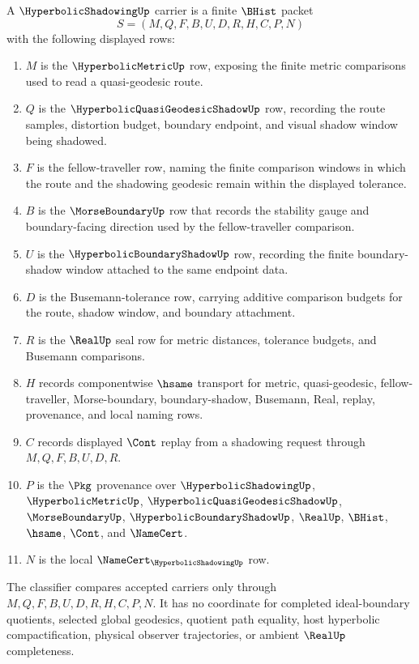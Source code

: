 \begin{definition}
\label{def:hyperbolic-shadowing-carrier}
A $\HyperbolicShadowingUp$ carrier is a finite $\BHist$ packet
$$
S=(M,Q,F,B,U,D,R,H,C,P,N)
$$
with the following displayed rows:
\begin{enumerate}
\item $M$ is the $\HyperbolicMetricUp$ row, exposing the finite metric comparisons used to read a quasi-geodesic route.
\item $Q$ is the $\HyperbolicQuasiGeodesicShadowUp$ row, recording the route samples, distortion budget, boundary endpoint, and visual shadow window being shadowed.
\item $F$ is the fellow-traveller row, naming the finite comparison windows in which the route and the shadowing geodesic remain within the displayed tolerance.
\item $B$ is the $\MorseBoundaryUp$ row that records the stability gauge and boundary-facing direction used by the fellow-traveller comparison.
\item $U$ is the $\HyperbolicBoundaryShadowUp$ row, recording the finite boundary-shadow window attached to the same endpoint data.
\item $D$ is the Busemann-tolerance row, carrying additive comparison budgets for the route, shadow window, and boundary attachment.
\item $R$ is the $\RealUp$ seal row for metric distances, tolerance budgets, and Busemann comparisons.
\item $H$ records componentwise $\hsame$ transport for metric, quasi-geodesic, fellow-traveller, Morse-boundary, boundary-shadow, Busemann, Real, replay, provenance, and local naming rows.
\item $C$ records displayed $\Cont$ replay from a shadowing request through $M,Q,F,B,U,D,R$.
\item $P$ is the $\Pkg$ provenance over $\HyperbolicShadowingUp$, $\HyperbolicMetricUp$, $\HyperbolicQuasiGeodesicShadowUp$, $\MorseBoundaryUp$, $\HyperbolicBoundaryShadowUp$, $\RealUp$, $\BHist$, $\hsame$, $\Cont$, and $\NameCert$.
\item $N$ is the local $\NameCert_{\HyperbolicShadowingUp}$ row.
\end{enumerate}
The classifier compares accepted carriers only through $M,Q,F,B,U,D,R,H,C,P,N$. It has no coordinate for completed ideal-boundary quotients, selected global geodesics, quotient path equality, host hyperbolic compactification, physical observer trajectories, or ambient $\RealUp$ completeness.
\end{definition}

